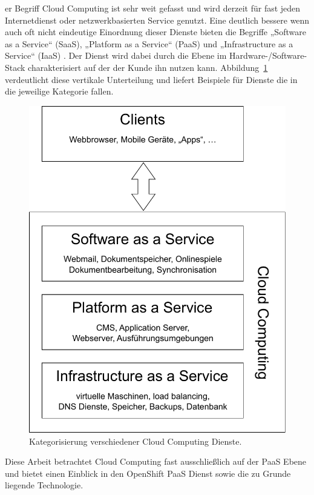 \documentclass[10pt,a4paper,compsoc]{IEEEtran}
\begin{document}
er Begriff Cloud Computing ist sehr weit gefasst und wird derzeit für fast jeden Internetdienst oder netzwerkbasierten Service genutzt. Eine deutlich bessere wenn auch oft nicht eindeutige Einordnung dieser Dienste bieten die Begriffe „Software as a Service“ (SaaS), „Platform as a Service“ (PaaS) und „Infrastructure as a Service“ (IaaS) \cite{nist_cc}. Der Dienst wird dabei durch die Ebene im Hardware-/Software-Stack charakterisiert auf der der Kunde ihn nutzen kann.
Abbildung~\ref{fig:cloudcomputing} verdeutlicht diese vertikale Unterteilung und liefert Beispiele für Dienste die in die jeweilige Kategorie fallen.
\begin{figure}[htbp]
	\centering
	\includegraphics[width=0.9\linewidth]{imgs/cloudcomputing}
	\caption{Kategorisierung verschiedener Cloud Computing Dienste.}
	\label{fig:cloudcomputing}
\end{figure}
Diese Arbeit betrachtet Cloud Computing fast ausschließlich auf der PaaS Ebene und bietet einen Einblick in den OpenShift PaaS Dienst sowie die zu Grunde liegende Technologie.
\end{document}

